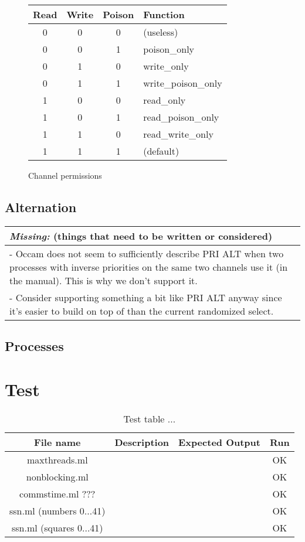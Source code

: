 \documentclass[a4paper,12pt]{article}
\newcommand{\missing}[1]{
\begin{tabular}{|p{11cm}|}
\hline
\emph{Missing:} {\scriptsize (things that need to be written or considered)} \\
\hline
#1
\hline
\end{tabular}
}
\begin{document}
\begin{figure}[h]
\centering
\begin{tabular}{c|c|c|l}
Read & Write & Poison & Function \\
\hline
0 & 0 & 0 & (useless) \\
0 & 0 & 1 & poison\_only \\
0 & 1 & 0 & write\_only \\
0 & 1 & 1 & write\_poison\_only \\
1 & 0 & 0 & read\_only \\
1 & 0 & 1 & read\_poison\_only \\
1 & 1 & 0 & read\_write\_only \\
1 & 1 & 1 & (default) \\
\end{tabular}
\caption{Channel permissions}
\label{channel-permissions}
\end{figure}

\subsection{Alternation}

\missing{
- Occam does not seem to sufficiently describe PRI ALT when two processes with inverse priorities
on the same two channels use it (in the manual). This is why we don't support it. \\
- Consider supporting something a bit like PRI ALT anyway since it's easier to build on top of
than the current randomized select. \\
}

\subsection{Processes}

\section{Test}

\label{test}
\begin{table}[ht]
\centering
\begin{tabular}{|c|c|c|c|}
    \hline
    	File name &
	Description &
	Expected Output &
	Run \\
    \hline
    	maxthreads.ml &
        &
        &
	OK \\
    \hline
    	nonblocking.ml &
        &
        &
	OK \\
    \hline
    	commstime.ml ??? &
        &
        &
	OK \\
    \hline
    	ssn.ml (numbers 0$\ldots$41) &
        &
        &
	OK \\
    \hline
    	ssn.ml (squares 0$\ldots$41) &
        &
        &
	OK \\
    \hline
\end{tabular} 
\caption{Test table ...}
\label{testtable}
\end{table}
\end{document}
